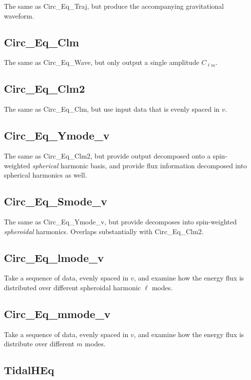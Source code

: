 \documentclass[11pt]{article}
\begin{document}
The same as Circ\_Eq\_Traj, but produce the accompanying gravitational waveform.

\subsection{Circ\_Eq\_Clm}

The same as Circ\_Eq\_Wave, but only output a single amplitude $C_{\ell m}$.

\subsection{Circ\_Eq\_Clm2}

The same as Circ\_Eq\_Clm, but use input data that is evenly spaced in $v$.

\subsection{Circ\_Eq\_Ymode\_v}

The same as Circ\_Eq\_Clm2, but provide output decomposed onto a spin-weighted {\it spherical} harmonic basis, and provide flux information decomposed into spherical harmonics as well.

\subsection{Circ\_Eq\_Smode\_v}

The same as Circ\_Eq\_Ymode\_v, but provide decomposes into spin-weighted {\it spheroidal} harmonics.  Overlaps substantially with Circ\_Eq\_Clm2.

\subsection{Circ\_Eq\_lmode\_v}

Take a sequence of data, evenly spaced in $v$, and examine how the energy flux is distributed over different spheroidal harmonic $\ell$ modes.

\subsection{Circ\_Eq\_mmode\_v}

Take a sequence of data, evenly spaced in $v$, and examine how the energy flux is distribute over different $m$ modes.

\subsection{TidalHEq}
\end{document}
